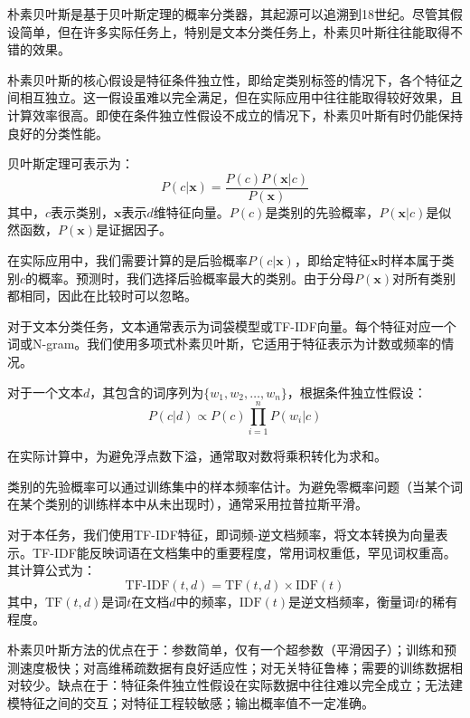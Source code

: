\documentclass[12pt,a4paper]{article}
\begin{document}
朴素贝叶斯是基于贝叶斯定理的概率分类器，其起源可以追溯到18世纪。尽管其假设简单，但在许多实际任务上，特别是文本分类任务上，朴素贝叶斯往往能取得不错的效果。

朴素贝叶斯的核心假设是特征条件独立性，即给定类别标签的情况下，各个特征之间相互独立。这一假设虽难以完全满足，但在实际应用中往往能取得较好效果，且计算效率很高。即使在条件独立性假设不成立的情况下，朴素贝叶斯有时仍能保持良好的分类性能。

贝叶斯定理可表示为：
\begin{equation}
    P(c|\boldsymbol{x}) = \frac{P(c)P(\boldsymbol{x}|c)}{P(\boldsymbol{x})}
\end{equation}
其中，$c$表示类别，$\boldsymbol{x}$表示$d$维特征向量。$P(c)$是类别的先验概率，$P(\boldsymbol{x}|c)$是似然函数，$P(\boldsymbol{x})$是证据因子。

在实际应用中，我们需要计算的是后验概率$P(c|\boldsymbol{x})$，即给定特征$\boldsymbol{x}$时样本属于类别$c$的概率。预测时，我们选择后验概率最大的类别。由于分母$P(\boldsymbol{x})$对所有类别都相同，因此在比较时可以忽略。

对于文本分类任务，文本通常表示为词袋模型或TF-IDF向量。每个特征对应一个词或N-gram。我们使用多项式朴素贝叶斯，它适用于特征表示为计数或频率的情况。

对于一个文本$d$，其包含的词序列为$\{w_1, w_2, \dots, w_n\}$，根据条件独立性假设：
\begin{equation}
    P(c|d) \propto P(c) \prod_{i=1}^n P(w_i|c)
\end{equation}

在实际计算中，为避免浮点数下溢，通常取对数将乘积转化为求和。

类别的先验概率可以通过训练集中的样本频率估计。为避免零概率问题（当某个词在某个类别的训练样本中从未出现时），通常采用拉普拉斯平滑。

对于本任务，我们使用TF-IDF特征，即词频-逆文档频率，将文本转换为向量表示。TF-IDF能反映词语在文档集中的重要程度，常用词权重低，罕见词权重高。其计算公式为：
\begin{equation}
    \text{TF-IDF}(t, d) = \text{TF}(t, d) \times \text{IDF}(t)
\end{equation}
其中，$\text{TF}(t, d)$是词$t$在文档$d$中的频率，$\text{IDF}(t)$是逆文档频率，衡量词$t$的稀有程度。

朴素贝叶斯方法的优点在于：参数简单，仅有一个超参数（平滑因子）；训练和预测速度极快；对高维稀疏数据有良好适应性；对无关特征鲁棒；需要的训练数据相对较少。缺点在于：特征条件独立性假设在实际数据中往往难以完全成立；无法建模特征之间的交互；对特征工程较敏感；输出概率值不一定准确。
\end{document}
